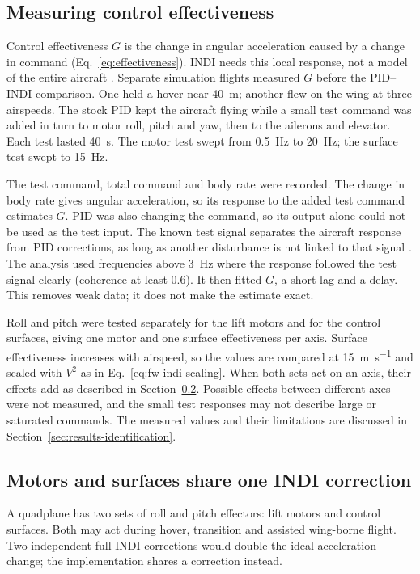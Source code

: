 \documentclass{article}
\begin{document}
\subsection{Measuring control effectiveness}
\label{sec:identification-method}
Control effectiveness $G$ is the change in angular acceleration caused by a change in command (Eq.~\eqref{eq:effectiveness}). INDI needs this local response, not a model of the entire aircraft \citep{steinertPart1_2025}. Separate simulation flights measured $G$ before the PID--INDI comparison. One held a hover near \SI{40}{\meter}; another flew on the wing at three airspeeds. The stock PID kept the aircraft flying while a small test command was added in turn to motor roll, pitch and yaw, then to the ailerons and elevator. Each test lasted \SI{40}{\second}. The motor test swept from \SI{0.5}{\hertz} to \SI{20}{\hertz}; the surface test swept to \SI{15}{\hertz}.

The test command, total command and body rate were recorded. The change in body rate gives angular acceleration, so its response to the added test command estimates $G$. PID was also changing the command, so its output alone could not be used as the test input. The known test signal separates the aircraft response from PID corrections, as long as another disturbance is not linked to that signal \citep{ljung1999}. The analysis used frequencies above \SI{3}{\hertz} where the response followed the test signal clearly (coherence at least $0.6$). It then fitted $G$, a short lag and a delay. This removes weak data; it does not make the estimate exact.

Roll and pitch were tested separately for the lift motors and for the control surfaces, giving one motor and one surface effectiveness per axis. Surface effectiveness increases with airspeed, so the values are compared at \SI{15}{\meter\per\second} and scaled with $V^2$ as in Eq.~\eqref{eq:fw-indi-scaling}. When both sets act on an axis, their effects add as described in Section~\ref{sec:indi-fw-implementation}. Possible effects between different axes were not measured, and the small test responses may not describe large or saturated commands. The measured values and their limitations are discussed in Section~\ref{sec:results-identification}.

\subsection{Motors and surfaces share one INDI correction}
\label{sec:indi-fw-implementation}
A quadplane has two sets of roll and pitch effectors: lift motors and control surfaces. Both may act during hover, transition and assisted wing-borne flight. Two independent full INDI corrections would double the ideal acceleration change; the implementation shares a correction instead.
\end{document}
